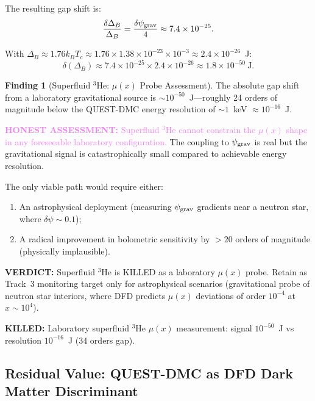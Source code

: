 \documentclass[11pt]{article}
\theoremstyle{definition}
\newtheorem{finding}[theorem]{Finding}
\theoremstyle{remark}
\newcommand{\ee}[1]{\times 10^{#1}}
\newcommand{\honest}[1]{\textcolor{violet}{\textbf{HONEST ASSESSMENT:} #1}}
\newcommand{\killed}[1]{\textcolor{red!70!black}{\textbf{KILLED:} #1}}
\newcommand{\verdict}[1]{\textcolor{green!50!black}{\textbf{VERDICT:} #1}}
\begin{document}
The resulting gap shift is:
\begin{equation}
\frac{\delta\Delta_B}{\Delta_B} = \frac{\delta\psi_{\rm grav}}{4}
\approx 7.4\ee{-25}.
\label{eq:gap_shift_num}
\end{equation}

With $\Delta_B \approx 1.76 k_B T_c \approx 1.76 \times 1.38\ee{-23}
\times 10^{-3} \approx 2.4\ee{-26}$~J:
\begin{equation}
\delta(\Delta_B) \approx 7.4\ee{-25} \times 2.4\ee{-26}
\approx 1.8\ee{-50}~\text{J}.
\label{eq:absolute_shift}
\end{equation}

\begin{finding}[Superfluid $^3$He: $\mu(x)$ Probe Assessment]
\label{find:he3_assessment}
The absolute gap shift from a laboratory gravitational source is
$\sim 10^{-50}$~J---roughly 24 orders of magnitude below the
QUEST-DMC energy resolution of $\sim 1$~keV $\approx 10^{-16}$~J.

\honest{Superfluid $^3$He cannot constrain the $\mu(x)$ shape in
any foreseeable laboratory configuration.} The coupling to
$\psi_{\rm grav}$ is real but the gravitational signal is
catastrophically small compared to achievable energy resolution.

The only viable path would require either:
\begin{enumerate}[nosep]
\item An astrophysical deployment (measuring $\psi_{\rm grav}$
  gradients near a neutron star, where $\delta\psi \sim 0.1$);
\item A radical improvement in bolometric sensitivity by $>20$
  orders of magnitude (physically implausible).
\end{enumerate}

\verdict{Superfluid $^3$He is KILLED as a laboratory $\mu(x)$
probe. Retain as Track~3 monitoring target only for astrophysical
scenarios (gravitational probe of neutron star interiors, where
DFD predicts $\mu(x)$ deviations of order $10^{-4}$ at
$x \sim 10^4$).}

\killed{Laboratory superfluid $^3$He $\mu(x)$ measurement:
signal $10^{-50}$~J vs resolution $10^{-16}$~J (34 orders gap).}
\end{finding}

\subsection{Residual Value: QUEST-DMC as DFD Dark Matter Discriminant}
\end{document}
